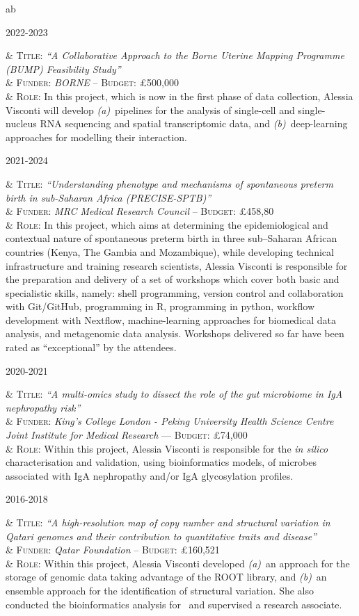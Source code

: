 \documentclass[a4paper,10pt]{article}
\newenvironment{singletablelist}
{	\vspace{-0.2cm}
	\begin{longtable}[!h]{ab}}{\end{longtable}
}
\newcommand{\stlist}[2]{
	\hspace{-3cm}
	\noindent
	\begin{minipage}{0.24\textwidth}
	\begin{flushright}
	\textsc{#1}
	\end{flushright}
	\end{minipage}
	& #2\\[0.2cm]
}
\begin{document}
\newpage

\begin{singletablelist}
	 
	\stlist{2022-2023}{
		  \textsc{Title:} \emph{``A Collaborative Approach to the Borne Uterine Mapping Programme (BUMP) Feasibility Study''}\\
		& \textsc{Funder:} \emph{BORNE} -- \textsc{Budget:} £500,000 \\
		& \textsc{Role:} In this project, which is now in the first phase of data collection, Alessia Visconti will develop \emph{(a)}~pipelines for the analysis of single-cell and single-nucleus RNA sequencing and spatial transcriptomic data, and \emph{(b)}~deep-learning approaches for modelling their interaction.
	} 
		
	\stlist{2021-2024}{ 
		  \textsc{Title:} \emph{``Understanding phenotype and mechanisms of spontaneous preterm birth in sub-Saharan Africa (PRECISE-SPTB)''}\\
		& \textsc{Funder:} \emph{MRC Medical Research Council} -- \textsc{Budget:} £458,80 \\
		& \textsc{Role:} In this project, which aims at determining the epidemiological and contextual nature of spontaneous preterm birth in three sub–Saharan African countries (Kenya, The Gambia and Mozambique), while developing technical infrastructure and training research scientists, Alessia Visconti is responsible for the preparation and delivery of a set of workshops which cover both basic and specialistic skills, namely: shell programming, version control and collaboration with Git/GitHub, programming in R, programming in python, workflow development with Nextflow, machine-learning approaches for biomedical data analysis, and metagenomic data analysis. Workshops delivered so far have been rated as “exceptional” by the attendees.
		}
		
	\stlist{2020-2021}{ 
		  \textsc{Title:} \emph{``A multi-omics study to dissect the role of the gut microbiome in IgA nephropathy risk''}\\
		& \textsc{Funder:} \emph{King's College London - Peking University Health Science Centre Joint Institute for Medical Research} --- \textsc{Budget:} £74,000 \\
		& \textsc{Role:}  Within this project, Alessia Visconti is responsible for the \emph{in silico} characterisation and validation, using bioinformatics models, of microbes associated with IgA nephropathy and/or IgA glycosylation profiles.
	}
		
	\stlist{2016-2018}{ 
		  \textsc{Title:} \emph{``A high-resolution map of copy number and structural variation in Qatari genomes and their contribution to quantitative traits and disease''}\\
		& \textsc{Funder:} \emph{Qatar Foundation} -- \textsc{Budget:} £160,521  \\
		& \textsc{Role:} Within this project, Alessia Visconti developed \emph{(a)}~an approach for the storage of genomic data taking advantage of the ROOT library, and \emph{(b)}~an ensemble approach for the identification of structural variation. She also conducted the bioinformatics analysis for~\cite{Ros21,Ros24} and supervised a research associate.
	}
		

\end{singletablelist}
\end{document}
